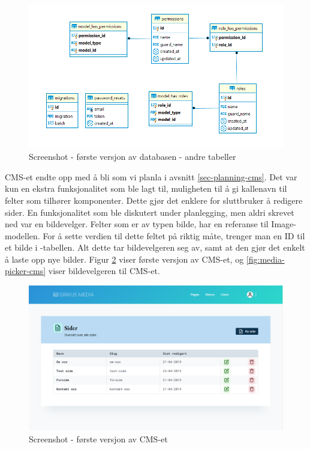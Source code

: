 \begin{figure}[H]
    \centering
    \includegraphics[width=\textwidth]{bjornar/db-endelig-annet.png}
    \caption{Screenshot - første versjon av databasen - andre tabeller}
    \label{fig:first-version-db-other}
\end{figure}

CMS-et endte opp med å bli som vi planla i avsnitt \ref{sec-planning-cms}. Det var kun en ekstra funksjonalitet som ble lagt til, muligheten til å gi kallenavn til felter som tilhører komponenter. Dette gjør det enklere for sluttbruker å redigere sider. En funksjonalitet som ble diskutert under planlegging, men aldri skrevet ned var en bildevelger. Felter som er av typen bilde, har en referanse til Image-modellen. For å sette verdien til dette feltet på riktig måte, trenger man en ID til et bilde i -tabellen. Alt dette tar bildevelgeren seg av, samt at den gjør det enkelt å laste opp nye bilder. Figur \ref{fig:first-version-cms} viser første versjon av CMS-et, og \ref{fig:media-picker-cms} viser bildevelgeren til CMS-et.

\begin{figure}[H]
    \centering
    \includegraphics[width=\textwidth]{first-version-cms.png}
    \caption{Screenshot - første versjon av CMS-et}
    \label{fig:first-version-cms}
\end{figure}

